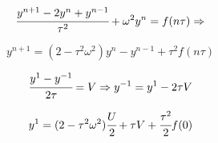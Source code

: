 \documentclass[12pt]{article}
\begin{document}
	\begin{equation*}
		\cfrac{y^{n + 1} - 2y^{n} + y^{n - 1}}{\tau^{2}} + \omega^{2} y^{n} = f(n\tau)
		\Rightarrow
	\end{equation*}

	\begin{equation*}
		y^{n + 1} = (2 - \tau^{2} \omega^{2})y^{n} - y^{n - 1} + \tau^{2}f(n\tau)
	\end{equation*}

	\begin{equation*}
		\cfrac{y^{1} - y^{-1}}{2\tau} = V
		\Rightarrow 
		y^{-1} = y^{1} - 2\tau V
	\end{equation*}

	\begin{equation*}
		y^{1} = (2 - \tau^2 \omega^2) \cfrac{U}{2} + \tau V + \cfrac{\tau^{2}}{2}f(0)
	\end{equation*}
\end{document}
